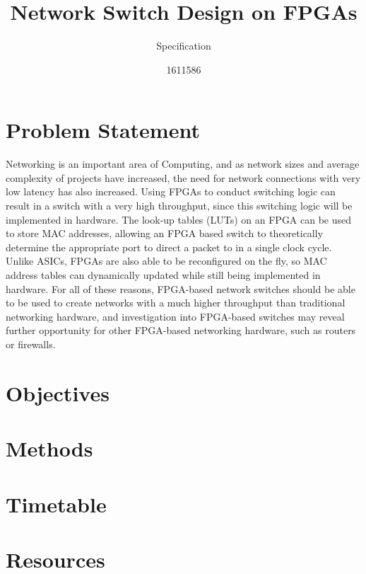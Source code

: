 \documentclass[12pt, a4paper, twoside]{IEEEtran}
\title{Network Switch Design on FPGAs}
\subtitle{Specification}
\author{1611586}
\begin{document}
\maketitle


\section{Problem Statement}
Networking is an important area of Computing, and as network sizes and average complexity of projects have increased,
the need for network connections with very low latency has also increased.
Using FPGAs to conduct switching logic can result in a switch with a very high throughput, since this switching logic will be implemented in hardware. The look-up tables (LUTs) on an FPGA can be used to store MAC addresses, allowing an FPGA based switch to theoretically determine the appropriate port to direct a packet to in a single clock cycle. Unlike ASICs, FPGAs are also able to be reconfigured on the fly, so MAC address tables can dynamically updated while still being implemented in hardware.
For all of these reasons, FPGA-based network switches should be able to be used to create networks with a much higher throughput than traditional networking hardware, and investigation into FPGA-based switches may reveal further opportunity for other FPGA-based networking hardware, such as routers or firewalls.

\section{Objectives}
\section{Methods}
\section{Timetable}
\section{Resources}




\end{document}
